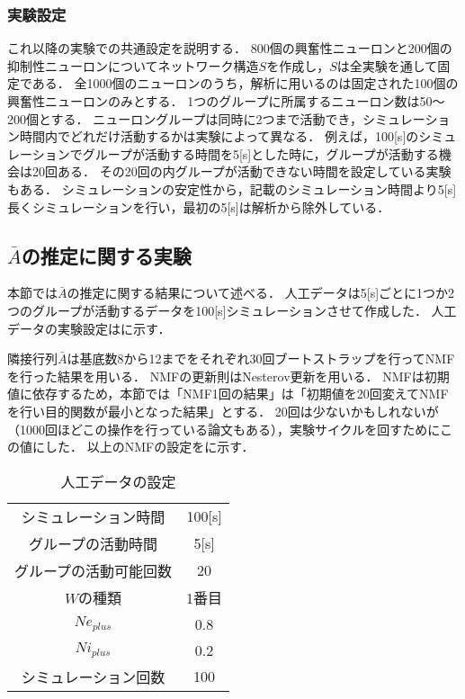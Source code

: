 \subsubsection{実験設定}
これ以降の実験での共通設定を説明する．
800個の興奮性ニューロンと200個の抑制性ニューロンについてネットワーク構造$S$を作成し，$S$は全実験を通して固定である．
全1000個のニューロンのうち，解析に用いるのは固定された100個の興奮性ニューロンのみとする．
1つのグループに所属するニューロン数は50〜200個とする．
ニューロングループは同時に2つまで活動でき，シミュレーション時間内でどれだけ活動するかは実験によって異なる．
例えば，100[s]のシミュレーションでグループが活動する時間を5[s]とした時に，グループが活動する機会は20回ある．
その20回の内グループが活動できない時間を設定している実験もある．
シミュレーションの安定性から，記載のシミュレーション時間より5[s]長くシミュレーションを行い，最初の5[s]は解析から除外している．

\subsection{$\bar{A}$の推定に関する実験}
本節では$\bar{A}$の推定に関する結果について述べる．
人工データは5[s]ごとに1つか2つのグループが活動するデータを100[s]シミュレーションさせて作成した．
人工データの実験設定はに示す．

隣接行列$\bar{A}$は基底数8から12までをそれぞれ30回ブートストラップを行ってNMFを行った結果を用いる．
NMFの更新則はNesterov更新\cite{Guan2012}を用いる．
NMFは初期値に依存するため，本節では「NMF1回の結果」は「初期値を20回変えてNMFを行い目的関数が最小となった結果」とする．
20回は少ないかもしれないが（1000回ほどこの操作を行っている論文もある），実験サイクルを回すためにこの値にした．
以上のNMFの設定をに示す．

\begin{table}[htb]
  \center
  \begin{tabular}{c|c} \hline
		シミュレーション時間 & 100[s]\\
		グループの活動時間 & 5[s] \\
		グループの活動可能回数 & 20 \\
		$W$の種類 & 1番目 \\
		$Ne_{plus}$ & 0.8 \\
		$Ni_{plus}$ & 0.2\\
		シミュレーション回数 & 100\\ \hline
  \end{tabular}
  \caption{人工データの設定}
  \label{tab:exp1param1}
\end{table}


